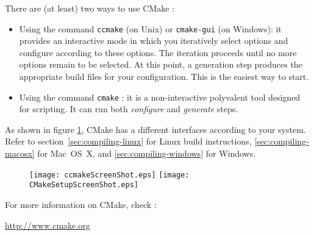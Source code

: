 There are (at least) two ways to use CMake :
\begin{itemize}
\item Using the command \texttt{ccmake} (on Unix) or \texttt{cmake-gui} (on Windows): 
it provides an interactive mode in which you iteratively select
options and configure according to these options. The iteration
proceeds until no more options remain to be selected. At this point, a
generation step produces the appropriate build files for your
configuration. This is the easiest way to start.
\item Using the command \texttt{cmake} : it is a non-interactive polyvalent tool designed for scripting. It can run both \textit{configure} and \textit{generate} steps.
\end{itemize}

As shown in figure \ref{fig:CMakeGUI}, CMake has a different interfaces according to your system.
Refer to section~\ref{sec:compiling-linux} for Linux build instructions, 
\ref{sec:compiling-macosx} for Mac~OS~X,
and \ref{sec:compiling-windows} for Windows.

\begin{figure}[tpb]
\centering
\texttt{[image: ccmakeScreenShot.eps]}
\texttt{[image: CMakeSetupScreenShot.eps]}
\label{fig:CMakeGUI}
\end{figure}

For more information on CMake, check :
\begin{center}
\url{http://www.cmake.org}
\end{center}

